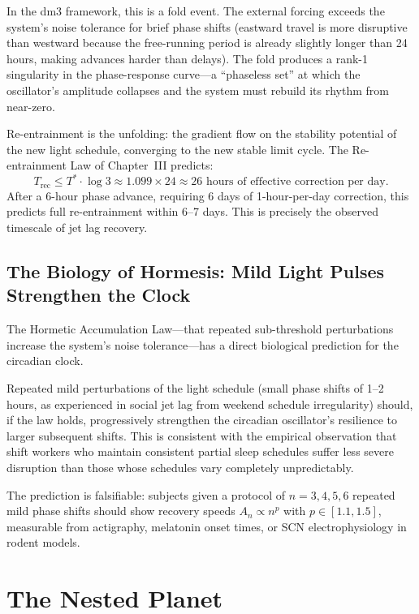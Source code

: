 \documentclass[12pt, oneside]{book}
\theoremstyle{plain}
\theoremstyle{definition}
\theoremstyle{remark}
\begin{document}
In the dm3 framework, this is a fold event. The external forcing
exceeds the system's noise tolerance for brief phase shifts
(eastward travel is more disruptive than westward because the
free-running period is already slightly longer than 24 hours,
making advances harder than delays). The fold produces a rank-1
singularity in the phase-response curve---a ``phaseless set''
at which the oscillator's amplitude collapses and the system
must rebuild its rhythm from near-zero.

Re-entrainment is the unfolding: the gradient flow on the
stability potential of the new light schedule, converging to
the new stable limit cycle. The Re-entrainment Law of Chapter~III
predicts:
\begin{equation}
T_{\mathrm{rec}} \leq T^* \cdot \log 3 \approx 1.099 \times 24
\approx 26 \text{ hours of effective correction per day.}
\end{equation}
After a 6-hour phase advance, requiring 6 days of 1-hour-per-day
correction, this predicts full re-entrainment within 6--7 days.
This is precisely the observed timescale of jet lag recovery.

\section{The Biology of Hormesis: Mild Light Pulses Strengthen the Clock}

The Hormetic Accumulation Law---that repeated sub-threshold
perturbations increase the system's noise tolerance---has a
direct biological prediction for the circadian clock.

Repeated mild perturbations of the light schedule (small phase
shifts of 1--2 hours, as experienced in social jet lag from
weekend schedule irregularity) should, if the law holds,
progressively strengthen the circadian oscillator's resilience
to larger subsequent shifts. This is consistent with the empirical
observation that shift workers who maintain consistent partial
sleep schedules suffer less severe disruption than those whose
schedules vary completely unpredictably.

The prediction is falsifiable: subjects given a protocol of
$n = 3, 4, 5, 6$ repeated mild phase shifts should show
recovery speeds $A_n \propto n^p$ with $p \in [1.1, 1.5]$,
measurable from actigraphy, melatonin onset times, or SCN
electrophysiology in rodent models.

\chapter{The Nested Planet}
\label{ch:planet}
\end{document}
